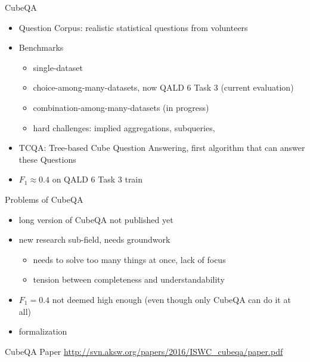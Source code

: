\documentclass[14pt]{beamer}
\begin{document}
\begin{frame}{CubeQA}
\begin{itemize}
\item Question Corpus: realistic statistical questions from volunteers
\item Benchmarks
\begin{itemize}
\item single-dataset
\item choice-among-many-datasets, now QALD 6 Task 3 (current evaluation)
\item combination-among-many-datasets (in progress)
\item hard challenges: implied aggregations, subqueries,  
\end{itemize}
\item TCQA: Tree-based Cube Question Answering, first algorithm that can answer these Questions
\item $F_1 \approx 0.4$ on QALD 6 Task 3 train
\end{itemize}
\end{frame}

\begin{frame}{Problems of CubeQA}
\begin{itemize}
\item long version of CubeQA not published yet
\item new research sub-field, needs groundwork
\begin{itemize}
\item needs to solve too many things at once, lack of focus
\item tension between completeness and understandability 
\end{itemize}
\item $F_1=0.4$ not deemed high enough (even though only CubeQA can do it at all)
\item formalization  
\end{itemize}
\end{frame}

\begin{frame}{CubeQA Paper}
\url{http://svn.aksw.org/papers/2016/ISWC\_cubeqa/paper.pdf}
\end{frame}
\end{document}
